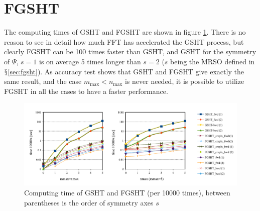 \section{FGSHT}

The computing times of \acs{GSHT} and \acs{FGSHT} are shown in figure
\ref{fig:time-gsht-fgsht}. There is no reason to see in detail how
much \acs{FFT} has accelerated the \acs{GSHT} process, but clearly
\acs{FGSHT} can be 100 times faster than \acs{GSHT}, and \acs{GSHT}
for the symmetry of $\Psi$, $s=1$ is on average 5 times longer than
$s=2$ ($s$ being the \acs{MRSO} defined in $\mathsection$\ref{sec:fgsht}).
As accuracy test shows that \acs{GSHT} and \acs{FGSHT} give exactly
the same result, and the case $m_{\max}<n_{\max}$ is never needed,
it is possible to utilize \acs{FGSHT} in all the cases to have a
faster performance.
\begin{center}
\begin{figure}[H]
\begin{centering}
\includegraphics[bb=0bp 20bp 731bp 263bp,width=1\columnwidth]{_figure/results/fgsht_perf}
\par\end{centering}
\caption[Computing time of \acs{GSHT} and \acs{FGSHT}]{Computing time of \acs{GSHT} and \acs{FGSHT} (per 10000 times),
between parentheses is the order of symmetry axes $s$\label{fig:time-gsht-fgsht}}
\end{figure}
\par\end{center}

